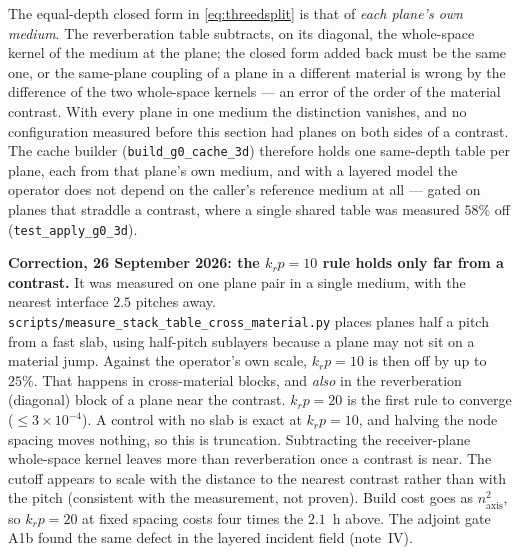 \documentclass[11pt,a4paper]{article}
\begin{document}
The equal-depth closed form in \eqref{eq:threedsplit} is that of \emph{each plane's own medium}.
The reverberation table subtracts, on its diagonal, the whole-space kernel of the medium at the
plane; the closed form added back must be the same one, or the same-plane coupling of a plane in
a different material is wrong by the difference of the two whole-space kernels --- an error of
the order of the material contrast. With every plane in one medium the distinction vanishes, and
no configuration measured before this section had planes on both sides of a contrast. The cache
builder (\texttt{build\_g0\_cache\_3d}) therefore holds one same-depth table per plane, each from
that plane's own medium, and with a layered model the operator does not depend on the caller's
reference medium at all --- gated on planes that straddle a contrast, where a single shared
table was measured $58\%$ off (\texttt{test\_apply\_g0\_3d}).

\medskip\noindent
\textbf{Correction, 26 September 2026: the $k_r p = 10$ rule holds only far from a contrast.} It
was measured on one plane pair in a single medium, with the nearest interface $2.5$ pitches away.
\texttt{scripts/measure\_stack\_table\_cross\_material.py} places planes half a pitch from a fast
slab, using half-pitch sublayers because a plane may not sit on a material jump. Against the
operator's own scale, $k_r p = 10$ is then off by up to $25\%$. That happens in cross-material
blocks, and \emph{also} in the reverberation (diagonal) block of a plane near the contrast.
$k_r p = 20$ is the first rule to converge (${\le}3\times10^{-4}$). A control with no slab is exact
at $k_r p = 10$, and halving the node spacing moves nothing, so this is truncation. Subtracting the
receiver-plane whole-space kernel leaves more than reverberation once a contrast is near. The
cutoff appears to scale with the distance to the nearest contrast rather than with the pitch
(consistent with the measurement, not proven). Build cost goes as $n_{\mathrm{axis}}^2$, so
$k_r p = 20$ at fixed spacing costs four times the $2.1$~h above. The adjoint gate A1b found the
same defect in the layered incident field (note~IV).
\end{document}

